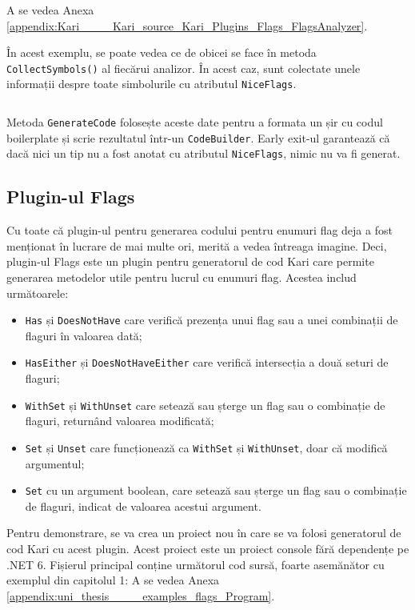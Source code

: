 \documentclass[a4paper,12pt]{report}
\begin{document}
A se vedea Anexa \ref{appendix:Kari____Kari_source_Kari_Plugins_Flags_FlagsAnalyzer}.

În acest exemplu, se poate vedea ce de obicei se face în metoda \texttt{CollectSymbols()} al fiecărui analizor.
În acest caz, sunt colectate unele informații despre toate simbolurile cu atributul \texttt{NiceFlags}.
\inputminted[firstline=159, lastline=170]{cs}{../Kari/source/Kari.Plugins/Flags/FlagsAnalyzer.cs}

Metoda \texttt{GenerateCode\(\)} folosește aceste date pentru a formata un șir cu codul boilerplate și scrie rezultatul într-un \texttt{CodeBuilder}.
Early exit-ul garantează că dacă nici un tip nu a fost anotat cu atributul \texttt{NiceFlags}, nimic nu va fi generat.


\subsection{Plugin-ul Flags}

Cu toate că plugin-ul pentru generarea codului pentru enumuri flag deja a fost menționat în lucrare de mai multe ori, merită a vedea întreaga imagine.
Deci, plugin-ul Flags este un plugin pentru generatorul de cod Kari care permite generarea metodelor utile pentru lucrul cu enumuri flag.
Acestea includ următoarele:

\begin{itemize}
  \item \texttt{Has} și \texttt{DoesNotHave} care verifică prezența unui flag sau a unei combinații de flaguri în valoarea dată;
  \item \texttt{HasEither} și \texttt{DoesNotHaveEither} care verifică intersecția a două seturi de flaguri;
  \item \texttt{WithSet} și \texttt{WithUnset} care setează sau șterge un flag sau o combinație de flaguri, returnând valoarea modificată;
  \item \texttt{Set} și \texttt{Unset} care funcționează ca \texttt{WithSet} și \texttt{WithUnset}, doar că modifică argumentul;
  \item \texttt{Set} cu un argument boolean, care setează sau șterge un flag sau o combinație de flaguri, indicat de valoarea acestui argument.
\end{itemize}

Pentru demonstrare, se va crea un proiect nou în care se va folosi generatorul de cod Kari cu acest plugin.
Acest proiect este un proiect console fără dependențe pe .NET 6.
Fișierul principal conține următorul cod sursă, foarte asemănător cu exemplul din capitolul 1:
A se vedea Anexa \ref{appendix:uni_thesis____examples_flags_Program}.
\end{document}
